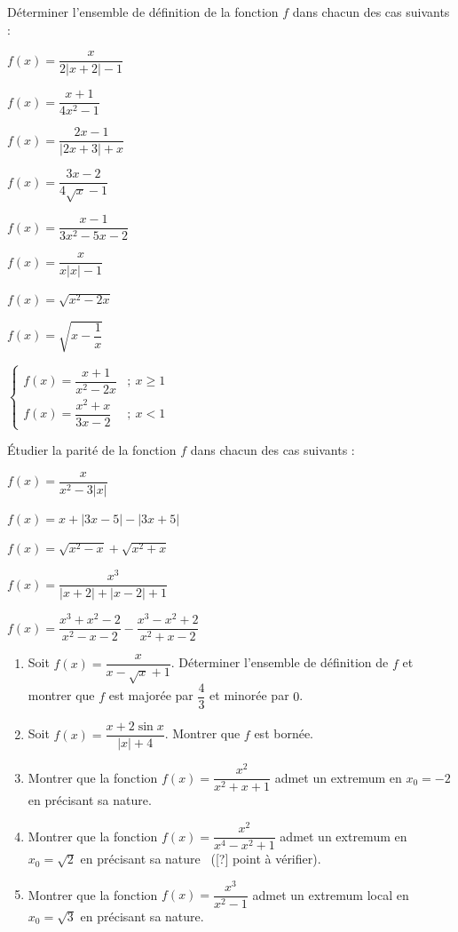 Déterminer l'ensemble de définition de la fonction $f$ dans chacun des cas suivants :
\begin{enumerate*}[label=\arabic*),itemjoin={\quad}]
\item $f(x)=\dfrac{x}{2|x+2|-1}$
\item $f(x)=\dfrac{x+1}{4x^2-1}$
\item $f(x)=\dfrac{2x-1}{|2x+3|+x}$
\item $f(x)=\dfrac{3x-2}{4\sqrt x-1}$
\item $f(x)=\dfrac{x-1}{3x^2-5x-2}$
\item $f(x)=\dfrac{x}{x|x|-1}$
\item $f(x)=\sqrt{x^2-2x}$
\item $f(x)=\sqrt{x-\dfrac1x}$
\item $\begin{cases}f(x)=\dfrac{x+1}{x^2-2x}&;\ x\geq1\\ f(x)=\dfrac{x^2+x}{3x-2}&;\ x<1\end{cases}$
\end{enumerate*}
\fin
{}
Étudier la parité de la fonction $f$ dans chacun des cas suivants :
\begin{enumerate*}[label=\arabic*),itemjoin={\quad}]
\item $f(x)=\dfrac{x}{x^2-3|x|}$
\item $f(x)=x+|3x-5|-|3x+5|$
\item $f(x)=\sqrt{x^2-x}+\sqrt{x^2+x}$
\item $f(x)=\dfrac{x^3}{|x+2|+|x-2|+1}$
\item $f(x)=\dfrac{x^3+x^2-2}{x^2-x-2}-\dfrac{x^3-x^2+2}{x^2+x-2}$
\end{enumerate*}
\fin
{}
\begin{enumerate}
\item Soit $f(x)=\dfrac{x}{x-\sqrt x+1}$. Déterminer l'ensemble de définition de $f$ et montrer que $f$ est majorée par $\dfrac43$ et minorée par $0$.
\item Soit $f(x)=\dfrac{x+2\sin x}{|x|+4}$. Montrer que $f$ est bornée.
\item Montrer que la fonction $f(x)=\dfrac{x^2}{x^2+x+1}$ admet un extremum en $x_0=-2$ en précisant sa nature.
\item Montrer que la fonction $f(x)=\dfrac{x^2}{x^4-x^2+1}$ admet un extremum en $x_0=\sqrt2$ en précisant sa nature \ ([?] point à vérifier).
\item Montrer que la fonction $f(x)=\dfrac{x^3}{x^2-1}$ admet un extremum local en $x_0=\sqrt3$ en précisant sa nature.
\end{enumerate}
